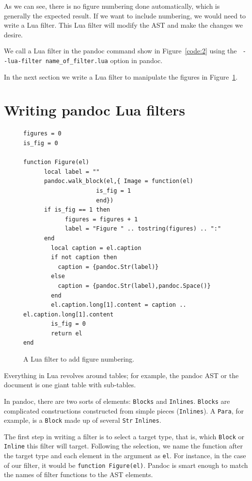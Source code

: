As we can see, there is no figure numbering done automatically, which is generally
the expected result. If we want to include numbering, we would need
to write a Lua filter. This Lua filter will modify the AST and make the changes we 
desire.

We call a Lua filter in the pandoc command show in Figure~\ref{code:2} using the \verb| --lua-filter name_of_filter.lua|
option in pandoc.

In the next section we write a Lua filter to manipulate the figures in Figure~\ref{code:3}.

\section{Writing pandoc Lua filters}

\begin{figure}[htbp]
\begin{verbatim}
figures = 0
is_fig = 0

function Figure(el)
      local label = ""
      pandoc.walk_block(el,{ Image = function(el)
                     is_fig = 1
                     end})
      if is_fig == 1 then
	        figures = figures + 1
	        label = "Figure " .. tostring(figures) .. ":"
      end
	    local caption = el.caption
	    if not caption then
          caption = {pandoc.Str(label)}
    	else
          caption = {pandoc.Str(label),pandoc.Space()}
    	end
    	el.caption.long[1].content = caption .. el.caption.long[1].content
    	is_fig = 0
    	return el
end
\end{verbatim}
\caption{A Lua filter to add figure numbering.}
\label{code:3}
\end{figure}

Everything in Lua revolves around tables; for example, the pandoc AST or the document is one giant table with sub-tables.

In pandoc, there are two sorts of elements: \verb|Blocks| and \verb|Inlines|. \verb|Blocks| are complicated constructions constructed from simple pieces (\verb|Inlines|). A \verb|Para|, for example, is a \verb|Block| made up of several \verb|Str| \verb|Inlines|.

The first step in writing a filter is to select a target type, that is, which \verb|Block| or \verb|Inline| this filter will target.
Following the selection, we name the function after the target type and each element in the argument as \verb|el|.
For instance, in the case of our filter, it would be \verb|function Figure(el)|. Pandoc is smart enough to match the names of filter functions to the AST elements.

